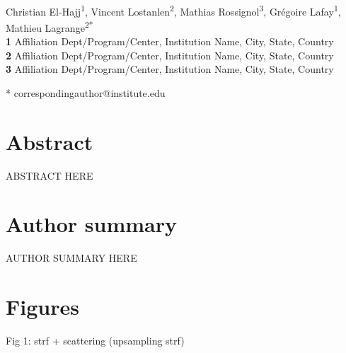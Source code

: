 \documentclass[10pt,letterpaper]{article}
\begin{document}
\vspace*{0.2in}

\begin{flushleft}
{\Large
\textbf{} %
}
\newline
\\
Christian El-Hajj\textsuperscript{1},
Vincent Lostanlen\textsuperscript{2},
Mathias Rossignol\textsuperscript{3},
Gr\'egoire Lafay\textsuperscript{1},
Mathieu Lagrange\textsuperscript{2*}
\\
\bigskip
\textbf{1} Affiliation Dept/Program/Center, Institution Name, City, State, Country
\\
\textbf{2} Affiliation Dept/Program/Center, Institution Name, City, State, Country
\\
\textbf{3} Affiliation Dept/Program/Center, Institution Name, City, State, Country
\\
\bigskip

* correspondingauthor@institute.edu

\end{flushleft}
\section*{Abstract}
ABSTRACT HERE

\section*{Author summary}
AUTHOR SUMMARY HERE

\linenumbers

\section*{Figures}

Fig 1: strf + scattering (upsampling strf)
\end{document}
